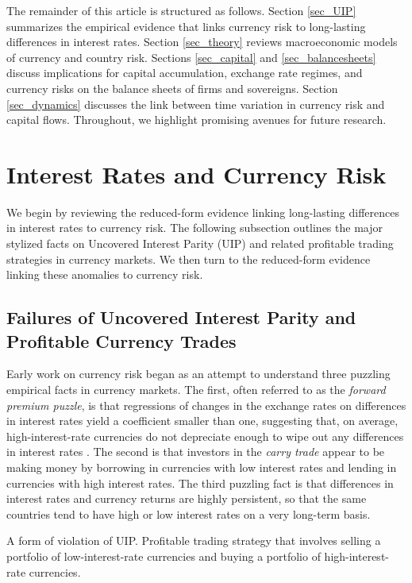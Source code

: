 \documentclass{ar-1col}
\begin{document}
The remainder of this article is structured as follows. Section \ref{sec_UIP} summarizes the empirical evidence that links currency risk to long-lasting differences in interest rates. Section \ref{sec_theory} reviews macroeconomic models of currency and country risk. Sections \ref{sec_capital} and \ref{sec_balancesheets} discuss implications for capital accumulation, exchange rate regimes, and currency risks on the balance sheets of firms and sovereigns.  Section \ref{sec_dynamics} discusses the link between time variation in currency risk and capital flows. Throughout, we highlight promising avenues for future research.


\section{Interest Rates and Currency Risk \label{sec_UIP}}

We begin by reviewing the reduced-form evidence linking long-lasting differences in interest rates to currency risk. The following subsection outlines the major stylized facts on Uncovered Interest Parity (UIP) and related profitable trading strategies in currency markets. We then turn to the reduced-form evidence linking these anomalies to currency risk. 

\subsection{Failures of
  Uncovered Interest Parity and Profitable Currency Trades }

Early work on currency risk began as an attempt to understand three puzzling empirical facts in currency markets. The first, often referred to as the \textit{forward premium puzzle}, is that regressions of changes in the exchange rates on differences in interest rates yield a coefficient smaller than one, suggesting that, on average, high-interest-rate currencies do not depreciate enough to wipe out any differences in interest rates \citep{Bilson1981, Fama1984}. The second is that investors in the \textit{carry trade} appear to be making money by borrowing in currencies with low interest rates and lending in currencies with high interest rates. The third puzzling fact is that differences in interest rates and currency returns are highly persistent, so that the same countries tend to have high or low interest rates on a very long-term basis.

\begin{marginnote}[]
    
   {A form of violation of UIP. Profitable trading strategy that involves selling a portfolio of low-interest-rate currencies and buying a portfolio of high-interest-rate currencies.} 
\end{marginnote}
\end{document}
